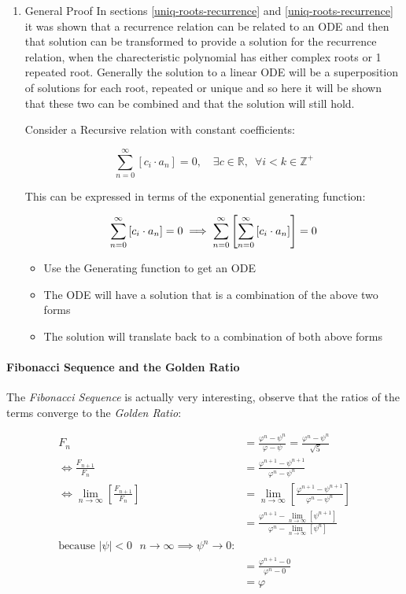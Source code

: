 \documentclass[11pt]{article}
\begin{document}
\begin{enumerate}
\item General Proof
\label{sec:org0618612}
In sections \ref{uniq-roots-recurrence} and \ref{uniq-roots-recurrence} it was shown that a recurrence relation can be related to an ODE and then that solution can be transformed to provide a solution for the recurrence relation, when the charecteristic polynomial has either complex roots or 1 repeated root. Generally the solution to a linear ODE will be a superposition of solutions for each root, repeated or unique and so here it will be shown that these two can be combined and that the solution will still hold.

Consider a Recursive relation with constant coefficients:

$$
\sum^{\infty}_{n= 0}   \left[ c_i \cdot  a_n \right] = 0, \quad \exists c \in
\mathbb{R}, \enspace \forall i<k\in\mathbb{Z}^+
$$

This can be expressed in terms of the exponential generating function:

$$
\sum^{\infty}_{n= 0}   \left[ c_i \cdot  a_n \right] = 0\\
\implies \sum^{\infty}_{n= 0}   \left[\sum^{\infty}_{n= 0}   \left[ c_i \cdot
a_n  \right]   \right] = 0
$$

\begin{itemize}
\item Use the Generating function to get an ODE
\item The ODE will have a solution that is a combination of the above two forms
\item The solution will translate back to a combination of both above forms
\end{itemize}
\end{enumerate}

\paragraph{Fibonacci Sequence and the Golden Ratio}
\label{fib-golden-ratio-proof}
The \emph{Fibonacci Sequence} is actually very interesting, observe that the ratios of the terms converge to the \emph{Golden Ratio}:

\begin{align*}
    F_n &= \frac{\varphi^n-\psi^n}{\varphi-\psi} = \frac{\varphi^n-\psi^n}{\sqrt 5} \\
    \iff \frac{F_{n+1}}{F_n}	&= \frac{\varphi^{n+ 1} - \psi^{n+  1}}{\varphi^{n} - \psi^{n}} \\
    \iff \lim_{n \rightarrow \infty}\left[ \frac{F_{n+1}}{F_n} \right]	&= \lim_{n \rightarrow \infty}\left[ \frac{\varphi^{n+ 1} - \psi^{n+  1}}{\varphi^{n} - \psi^{n}} \right] \\
&= \frac{\varphi^{n+ 1} -\lim_{n \rightarrow \infty}\left[ \psi^{n +  1} \right] }{\varphi^{n} - \lim_{n \rightarrow \infty}\left[ \psi^n \right] } \\
\text{because $\mid \psi \mid < 0$ $n \rightarrow \infty \implies \psi^{n} \rightarrow 0$:} \\
&= \frac{\varphi^{n+  1} -  0}{\varphi^{n} -  0} \\
&= \varphi
\end{align*}
\end{document}
